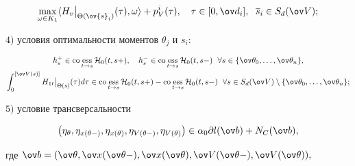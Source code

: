 \begin{thm}
\begin{gather}
\max_{\omega \in K_1}\langle {H}_{v}


\big|_{ \Theta(\ov{s}_i)}(\tau),\omega\rangle + p_V^i(\tau),


\quad \tau \in [0,\ov d_i],\ \;\overline s_i\in S_d(\ov


V); \label{eq:(5.10)}


\end{gather}





$4)$ условия оптимальности моментов $\theta_j$ и $s_i:$





\begin{gather*}


h_s^{+}\in


\co \ess_{t\rightarrow s}{\cal H}_0(t, s+),\quad


h_s^{-}\in


\co \ess_{t\rightarrow s}{\cal H}_0(t, s-)


\ \; \forall s\in \{\ov\theta_0,\dotsc,\ov\theta_n\}, \\


%


\int_0^{[\ov V(s)]} {H}_{1t} \big|_{ \Theta(s)}(\tau)d\tau


\in \co \ess_{t\rightarrow {s}} {\cal


H}_0(t,{s}+) - \co\ess_{t\rightarrow


{s}} {\cal H}_0(t,{s}-)\ \;


\forall s\in S_d(\ov V)\setminus


\{\ov\theta_0,\dotsc,\ov\theta_n\};


\end{gather*}





$5)$ условие трансверсальности


$$


\big(\eta_\theta,\eta_{x(\theta-)},\eta_{x(\theta)},


\eta_{V(\theta-)},\eta_{V(\theta)}\big)\in \alpha_0\partial


l(\ov b)+N_C(\ov b),


$$


где $\ov b=(\ov\theta,\ov x(\ov\theta-),\ov


x(\ov\theta),\ov V(\ov\theta-),\ov V(\ov\theta)),$


\begin{align*}



\end{align*}
\end{thm}
